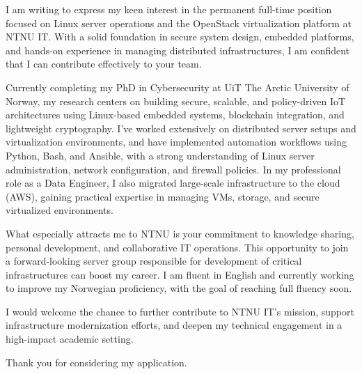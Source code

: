 I am writing to express my keen interest in the permanent full-time position focused on Linux server operations and the OpenStack virtualization platform at NTNU IT. With a solid foundation in secure system design, embedded platforms, and hands-on experience in managing distributed infrastructures, I am confident that I can contribute effectively to your team.

Currently completing my PhD in Cybersecurity at UiT The Arctic University of Norway, my research centers on building secure, scalable, and policy-driven IoT architectures using Linux-based embedded systems, blockchain integration, and lightweight cryptography. I’ve worked extensively on distributed server setups and virtualization environments, and have implemented automation workflows using Python, Bash, and Ansible, with a strong understanding of Linux server administration, network configuration, and firewall policies. In my professional role as a Data Engineer, I also migrated large-scale infrastructure to the cloud (AWS), gaining practical expertise in managing VMs, storage, and secure virtualized environments.

What especially attracts me to NTNU is your commitment to knowledge sharing, personal development, and collaborative IT operations. This opportunity to join a forward-looking server group responsible for development of critical infrastructures can boost my career. I am fluent in English and currently working to improve my Norwegian proficiency, with the goal of reaching full fluency soon.

I would welcome the chance to further contribute to NTNU IT’s mission, support infrastructure modernization efforts, and deepen my technical engagement in a high-impact academic setting.

Thank you for considering my application.